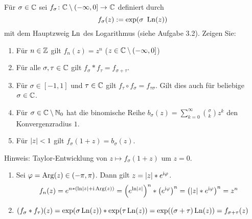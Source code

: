 \begin{exercisePage}
	\begin{task}
		Für $\sigma \in \mathbb{C}$ sei $\abb{f_\sigma}{\CC \setminus (- \infty, 0]}{\CC}$ definiert durch
		\begin{equation*}
			f_\sigma(z) \mathrel{:=} \exp(\sigma \ \operatorname{Ln}(z))
		\end{equation*}
		mit dem Hauptzweig $\operatorname{Ln}$ des Logarithmus (siehe Aufgabe 3.2). Zeigen Sie:
		\begin{enumerate}
			\item Für $n \in \mathbb{Z}$ gilt $f_n(z) = z^n$ ($z \in \mathbb{C} \setminus (-\infty, 0]$)
			\item Für alle $\sigma, \tau \in \mathbb{C}$ gilt $f_\sigma * f_\tau = f_{\sigma + \tau}$.
			\item Für $\sigma \in [-1,1]$ und $\tau \in \mathbb{C}$ gilt $f_\tau \circ f_\sigma = f_{\tau \sigma}$. Gilt dies auch für beliebige $\sigma \in \mathbb{C}$.
			\item Für $\sigma \in \mathbb{C} \setminus \mathbb{N}_0$ hat die binomische Reihe $b_\sigma(z) = \sum_{k=0}^{\infty} \binom{\sigma}{k} z^k$ den Konvergenzradius $1$.
			\item Für $\left| z \right| < 1$ gilt $f_\sigma(1+z) = b_\sigma(z)$.			
		\end{enumerate}
		Hinweis: Taylor-Entwicklung von $z \mapsto f_\sigma(1+z)$ um $z=0$.
	\end{task}

	\begin{enumerate}[label=(zu \alph*), leftmargin=*]
		\item Sei $\varphi = \operatorname{Arg}(z) \in (-\pi, \pi)$. Dann gilt $z = \left| z \right| * e^{\mathrm{i} \varphi}$. 
		\begin{equation*}
			f_n(z) = e^{n * (\ln\left| z \right| + \mathrm{i} \operatorname{Arg}(z))} = \left( e^{\ln\left| z \right|} \right)^n * \left( e^{\mathrm{i} \varphi} \right)^n = \left( \left| z \right| * e^{\mathrm{i} \varphi} \right)^n = z^n
		\end{equation*}
		\item $(f_\sigma * f_\tau)(z) = \exp(\sigma \operatorname{Ln}(z)) * \exp(\tau \operatorname{Ln}(z)) = \exp((\sigma + \tau) \operatorname{Ln}(z)) = f_{\sigma + \tau}(z)$
	\end{enumerate}
\end{exercisePage}
